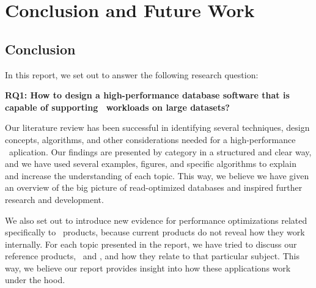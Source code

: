 \chapter{Conclusion and Future Work}
\label{chap:Conclusion and Future Work}

\section{Conclusion}
\label{sec:Conclusion}
In this report, we set out to answer the following research question:

\textbf{RQ1: How to design a high-performance database software that is capable of supporting \bd~workloads on large datasets?} 

Our literature review has been successful in identifying several techniques, design concepts, algorithms, and other considerations needed for a high-performance \bd~aplication. Our findings are presented by category in a structured and clear way, and we have used several examples, figures, and specific algorithms to explain and increase the understanding of each topic. This way, we believe we have given an overview of the big picture of read-optimized databases and inspired further research and development.

We also set out to introduce new evidence for performance optimizations related specifically to \bd~products, because current products do not reveal how they work internally. For each topic presented in the report, we have tried to discuss our reference products, \qlikview~and \tableau, and how they relate to that particular subject. This way, we believe our report provides insight into how these applications work under the hood.

